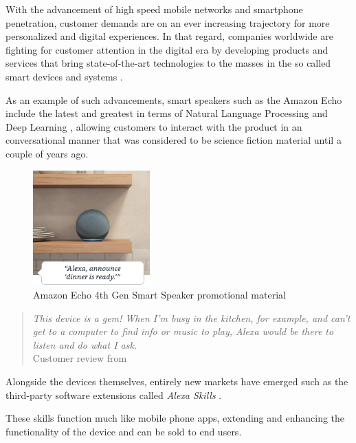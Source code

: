 \documentclass[openright]{normas-utf-tex} %
\begin{document}
With the advancement of high speed mobile networks and smartphone penetration,
customer demands are on an ever increasing trajectory for more personalized and
digital experiences. In that regard, companies worldwide are fighting for
customer attention in the digital era by developing products and services that
bring state-of-the-art technologies to the masses in the so called smart
devices and systems \cite{Shafique2020}.

As an example of such advancements, smart speakers such as the Amazon Echo
\cite{GaoPanWangChen2018} include the latest and greatest in terms of Natural
Language Processing and Deep Learning \cite{Young2018}, allowing customers to
interact with the product in an conversational manner that was considered to be
science fiction material until a couple of years ago.

\begin{figure}[!htb]
	\centering
	\includegraphics[width=0.4\textwidth]{./images/echodot4.jpg} %
	\caption[Amazon Echo 4th Generation smart speaker promotional material]{Amazon Echo 4th Gen Smart Speaker promotional material}
	\label{fig:echodot4}
\end{figure}

\begin{quote}
    \textit{This device is a gem! When I’m busy in the kitchen, for example, and can’t get
    to a computer to find info or music to play, Alexa would be there to listen
    and do what I ask.} \\
    Customer review from \cite{GaoPanWangChen2018}
\end{quote}

Alongside the devices themselves, entirely new markets have emerged such as the
third-party software extensions called \textit{Alexa Skills} \cite{Alexa2022}.

These skills function much like mobile phone apps, extending and enhancing the
functionality of the device and can be sold to end users.
\end{document}
